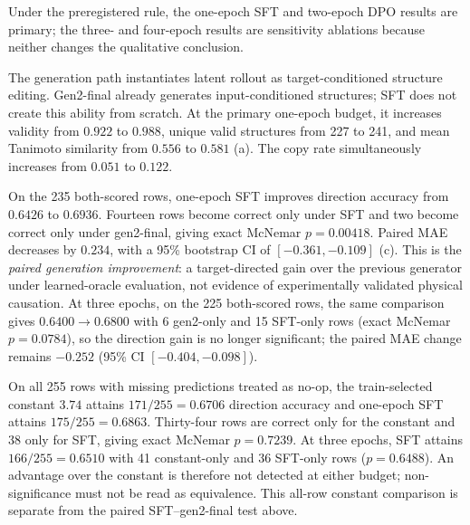 \documentclass[11pt]{article}
\begin{document}
Under the preregistered rule, the one-epoch SFT and two-epoch DPO results are primary; the three- and four-epoch results are sensitivity ablations because neither changes the qualitative conclusion.

The generation path instantiates latent rollout as target-conditioned structure editing. Gen2-final already generates input-conditioned structures; SFT does not create this ability from scratch. At the primary one-epoch budget, it increases validity from $0.922$ to $0.988$, unique valid structures from 227 to 241, and mean Tanimoto similarity from $0.556$ to $0.581$ (a). The copy rate simultaneously increases from $0.051$ to $0.122$.

On the 235 both-scored rows, one-epoch SFT improves direction accuracy from $0.6426$ to $0.6936$. Fourteen rows become correct only under SFT and two become correct only under gen2-final, giving exact McNemar $p=0.00418$. Paired MAE decreases by $0.234$, with a 95\% bootstrap CI of $[-0.361,-0.109]$ (c). This is the \emph{paired generation improvement}: a target-directed gain over the previous generator under learned-oracle evaluation, not evidence of experimentally validated physical causation. At three epochs, on the 225 both-scored rows, the same comparison gives $0.6400\rightarrow0.6800$ with 6 gen2-only and 15 SFT-only rows (exact McNemar $p=0.0784$), so the direction gain is no longer significant; the paired MAE change remains $-0.252$ (95\% CI $[-0.404,-0.098]$).

On all 255 rows with missing predictions treated as no-op, the train-selected constant $3.74$ attains $171/255=0.6706$ direction accuracy and one-epoch SFT attains $175/255=0.6863$. Thirty-four rows are correct only for the constant and 38 only for SFT, giving exact McNemar $p=0.7239$. At three epochs, SFT attains $166/255=0.6510$ with 41 constant-only and 36 SFT-only rows ($p=0.6488$). An advantage over the constant is therefore not detected at either budget; non-significance must not be read as equivalence. This all-row constant comparison is separate from the paired SFT--gen2-final test above.
\end{document}
